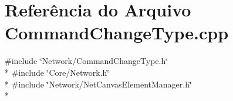 \section{Referência do Arquivo Command\+Change\+Type.\+cpp}
\label{_command_change_type_8cpp}
{\ttfamily \#include \char`\"{}Network/\+Command\+Change\+Type.\+h\char`\"{}}\\*
{\ttfamily \#include \char`\"{}Core/\+Network.\+h\char`\"{}}\\*
{\ttfamily \#include \char`\"{}Network/\+Net\+Canvas\+Element\+Manager.\+h\char`\"{}}\\*
